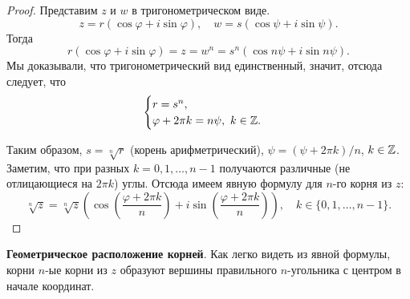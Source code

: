 \begin{proof}
    Представим $z$ и $w$ в тригонометрическом виде.
    $$
    z = r(\cos\varphi + i\sin\varphi),\quad w = s(\cos\psi + i\sin\psi).
    $$
    Тогда
    $$
    r(\cos\varphi + i\sin\varphi) = z = w^n = s^n(\cos n\psi + i\sin n\psi).
    $$
    Мы доказывали, что тригонометрический вид единственный, значит, отсюда следует, что
    $$
    \begin{cases}
        r = s^n,\\
        \varphi + 2\pi k = n\psi,\ k \in \mathbb{Z}.
    \end{cases}
    $$

    Таким образом, $s = \sqrt[n]{r}$ (корень арифметрический), $\psi = (\psi + 2\pi k) / n$, $k \in \mathbb{Z}$. Заметим, что при разных $k = 0, 1, \ldots, n - 1$ получаются различные (не отлицающиеся на $2\pi k$) углы. Отсюда имеем явную формулу для $n$-го корня из $z$:
    $$
    \sqrt[n]{z} = \sqrt[n]{z}\left(\cos\left(\frac{\varphi + 2\pi k}{n}\right) + i\sin\left(\frac{\varphi + 2\pi k}{n}\right)\right),\quad k \in \{0, 1, \ldots, n - 1\}.
    $$
\end{proof}

\textbf{Геометрическое расположение корней}. Как легко видеть из явной формулы, корни $n$-ые корни из $z$ образуют вершины правильного $n$-угольника с центром в начале координат.


